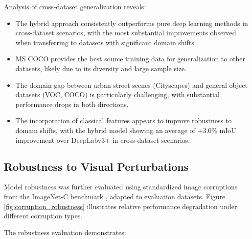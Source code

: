 Analysis of cross-dataset generalization reveals:

\begin{itemize}
    \item The hybrid approach consistently outperforms pure deep learning methods in cross-dataset scenarios, with the most substantial improvements observed when transferring to datasets with significant domain shifts.
    
    \item MS COCO provides the best source training data for generalization to other datasets, likely due to its diversity and large sample size.
    
    \item The domain gap between urban street scenes (Cityscapes) and general object datasets (VOC, COCO) is particularly challenging, with substantial performance drops in both directions.
    
    \item The incorporation of classical features appears to improve robustness to domain shifts, with the hybrid model showing an average of +3.0\% mIoU improvement over DeepLabv3+ in cross-dataset scenarios.
\end{itemize}

\subsection{Robustness to Visual Perturbations}
Model robustness was further evaluated using standardized image corruptions from the ImageNet-C benchmark \cite{hendrycks2019benchmarking}, adapted to evaluation datasets. Figure \ref{fig:corruption_robustness} illustrates relative performance degradation under different corruption types.


The robustness evaluation demonstrates:

